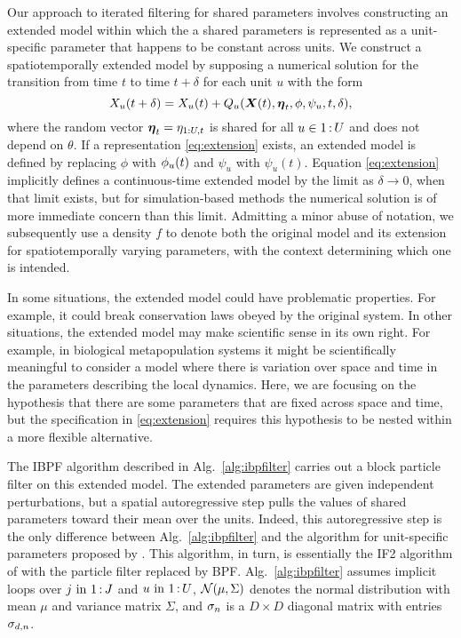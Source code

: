 \documentclass[12pt]{article}\usepackage[]{graphicx}\usepackage[]{xcolor}
\begin{document}
Our approach to iterated filtering for shared parameters involves constructing an extended model within which the a shared parameters is represented as a unit-specific parameter that happens to be constant across units.
We construct a spatiotemporally extended model by supposing a numerical solution for the transition from time $t$ to time $t+\delta$ for each unit $u$ with the form
\begin{equation}
\label{eq:extension}
  X_{u}(t+\delta) = X_u(t) + Q_u(\boldsymbol{X}(t),\boldsymbol{\eta}_t,\phi,\psi_{u},t,\delta),
\end{equation}
where the random vector $\boldsymbol{\eta}_t=\eta_{1:U,t}$ is shared for all $u\in {1}{\hspace{0.6mm}:\hspace{0.6mm}}{U}$ and does not depend on $\theta$.
If a representation \ref{eq:extension} exists, an extended model is defined by replacing $\phi$ with $\phi_{u}(t)$ and $\psi_u$ with $\psi_{u}(t)$.
Equation \ref{eq:extension} implicitly defines a continuous-time extended model by the limit as $\delta\to 0$, when that limit exists, but for simulation-based methods the numerical solution is of more immediate concern than this limit.
Admitting a minor abuse of notation, we subsequently use a density $f$ to denote both the original model and its extension for spatiotemporally varying parameters, with the context determining which one is intended.


In some situations, the extended model could have problematic properties.
For example, it could break conservation laws obeyed by the original system.
In other situations, the extended model may make scientific sense in its own right.
For example, in biological metapopulation systems it might be scientifically meaningful to consider a model where there is variation over space and time in the parameters describing the local dynamics.
Here, we are focusing on the hypothesis that there are some parameters that are fixed across space and time, but the specification in \eqref{eq:extension} requires this hypothesis to be nested within a more flexible alternative.

The IBPF algorithm described in Alg.~\ref{alg:ibpfilter} carries out a block particle filter on this extended model.
The extended parameters are given independent perturbations, but a spatial autoregressive step pulls the values of shared parameters toward their mean over the units.
Indeed, this autoregressive step is the only difference between  Alg.~\ref{alg:ibpfilter} and the algorithm for unit-specific parameters proposed by \citet{ning21-ibpf}.
This algorithm, in turn, is essentially the IF2 algorithm of \citet{ionides15} with the particle filter replaced by BPF.
Alg.~\ref{alg:ibpfilter} assumes implicit loops over $\np\ \text{in}\ \seq{1}{\Np}$ and $\unit\ \text{in}\ \seq{1}{\Unit}$, 
$\mathcal{N}(\mu,\Sigma)$ denotes the normal distribution with mean $\mu$ and variance matrix $\Sigma$, and
$\sigma_n$ is a $D\times D$ diagonal matrix with entries $\sigma_{d,n}$.
\end{document}
